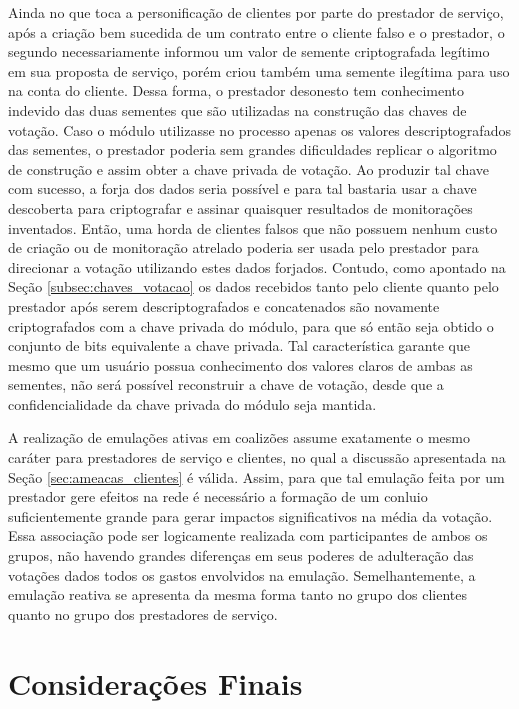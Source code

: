 Ainda no que toca a personificação de clientes por parte do prestador de serviço, após a criação bem sucedida de um contrato entre o cliente falso e o prestador, o segundo necessariamente informou um valor de semente criptografada legítimo em sua proposta de serviço, porém criou também uma semente ilegítima para uso na conta do cliente. Dessa forma, o prestador desonesto tem conhecimento indevido das duas sementes que são utilizadas na construção das chaves de votação. Caso o módulo utilizasse no processo apenas os valores descriptografados das sementes, o prestador poderia sem grandes dificuldades replicar o algoritmo de construção e assim obter a chave privada de votação. Ao produzir tal chave com sucesso, a forja dos dados seria possível e para tal bastaria usar a chave descoberta para criptografar e assinar quaisquer resultados de monitorações inventados. Então, uma horda de clientes falsos que não possuem nenhum custo de criação ou de monitoração atrelado poderia ser usada pelo prestador para direcionar a votação utilizando estes dados forjados. Contudo, como apontado na Seção \ref{subsec:chaves_votacao} os dados recebidos tanto pelo cliente quanto pelo prestador após serem descriptografados e concatenados são novamente criptografados com a chave privada do módulo, para que só então seja obtido o conjunto de bits equivalente a chave privada. Tal característica garante que mesmo que um usuário possua conhecimento dos valores claros de ambas as sementes, não será possível reconstruir a chave de votação, desde que a confidencialidade da chave privada do módulo seja mantida.

%
A realização de emulações ativas em coalizões assume exatamente o mesmo caráter para prestadores de serviço e clientes, no qual a discussão apresentada na Seção \ref{sec:ameacas_clientes} é válida. Assim, para que tal emulação feita por um prestador gere efeitos na rede é necessário a formação de um conluio suficientemente grande para gerar impactos significativos na média da votação. Essa associação pode ser logicamente realizada com participantes de ambos os grupos, não havendo grandes diferenças em seus poderes de adulteração das votações dados todos os gastos envolvidos na emulação. Semelhantemente, a emulação reativa se apresenta da mesma forma tanto no grupo dos clientes quanto no grupo dos prestadores de serviço. 

\section{Considerações Finais}
\label{sec:consideracoes_ameacas}

